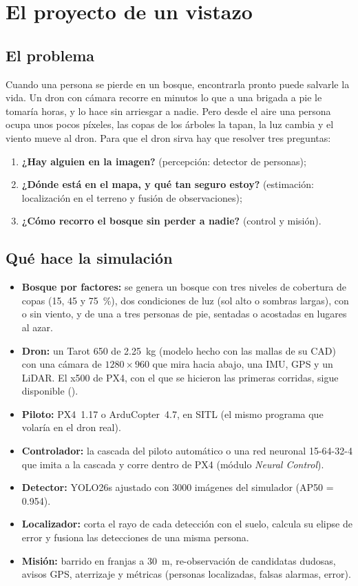 \chapter{El proyecto de un vistazo}

\section{El problema}

Cuando una persona se pierde en un bosque, encontrarla pronto puede salvarle la vida. Un dron con
cámara recorre en minutos lo que a una brigada a pie le tomaría horas, y lo hace sin arriesgar a
nadie. Pero desde el aire una persona ocupa unos pocos píxeles, las copas de los árboles la tapan, la
luz cambia y el viento mueve al dron. Para que el dron sirva hay que resolver tres preguntas:
\begin{enumerate}
  \item \textbf{¿Hay alguien en la imagen?} (percepción: detector de personas);
  \item \textbf{¿Dónde está en el mapa, y qué tan seguro estoy?} (estimación: localización en el
        terreno y fusión de observaciones);
  \item \textbf{¿Cómo recorro el bosque sin perder a nadie?} (control y misión).
\end{enumerate}

\section{Qué hace la simulación}

\begin{itemize}
  \item \textbf{Bosque por factores:} se genera un bosque con tres niveles de cobertura de copas (15,
        45 y 75~\%), dos condiciones de luz (sol alto o sombras largas), con o sin viento, y de una a
        tres personas de pie, sentadas o acostadas en lugares al azar.
  \item \textbf{Dron:} un Tarot 650 de 2.25~kg (modelo hecho con las mallas de su CAD) con una cámara
        de $1280\times960$ que mira hacia abajo, una IMU, GPS y un LiDAR. El x500 de PX4, con el que se
        hicieron las primeras corridas, sigue disponible ().
  \item \textbf{Piloto:} PX4~1.17 o ArduCopter~4.7, en SITL (el mismo programa que volaría en el dron
        real).
  \item \textbf{Controlador:} la cascada del piloto automático o una red neuronal 15-64-32-4 que
        imita a la cascada y corre dentro de PX4 (módulo \emph{Neural Control}).
  \item \textbf{Detector:} YOLO26s ajustado con 3000 imágenes del simulador (AP50 = 0.954).
  \item \textbf{Localizador:} corta el rayo de cada detección con el suelo, calcula su elipse de error
        y fusiona las detecciones de una misma persona.
  \item \textbf{Misión:} barrido en franjas a 30~m, re-observación de candidatas dudosas, avisos GPS,
        aterrizaje y métricas (personas localizadas, falsas alarmas, error).
\end{itemize}

